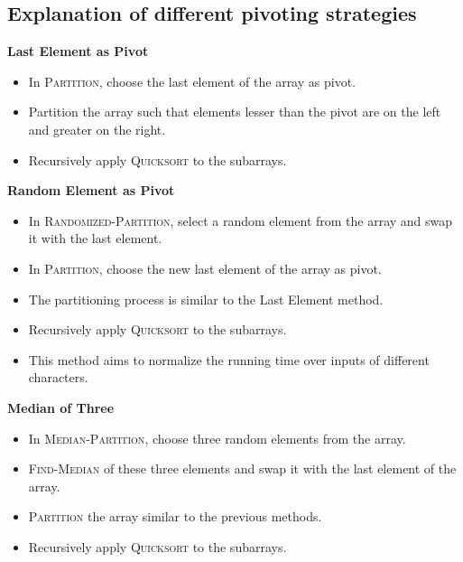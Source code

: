 \subsection{Explanation of different pivoting strategies}
\textbf{Last Element as Pivot}
\begin{itemize}
    \item In \textsc{Partition}, choose the last element of the array as pivot.
    \item Partition the array such that elements lesser than the pivot are on the left and greater on the right.
    \item Recursively apply \textsc{Quicksort} to the subarrays.
\end{itemize}
\textbf{Random Element as Pivot}
\begin{itemize}
    \item In \textsc{Randomized-Partition}, select a random element from the array and swap it with the last element.
    \item In \textsc{Partition}, choose the new last element of the array as pivot.
    \item The partitioning process is similar to the Last Element method.
    \item Recursively apply \textsc{Quicksort} to the subarrays.
    \item This method aims to normalize the running time over inputs of different characters.
\end{itemize}
\textbf{Median of Three}
\begin{itemize}
    \item In \textsc{Median-Partition}, choose three random elements from the array.
    \item \textsc{Find-Median} of these three elements and swap it with the last element of the array.
    \item \textsc{Partition} the array similar to the previous methods.
    \item Recursively apply \textsc{Quicksort} to the subarrays.
\end{itemize}

